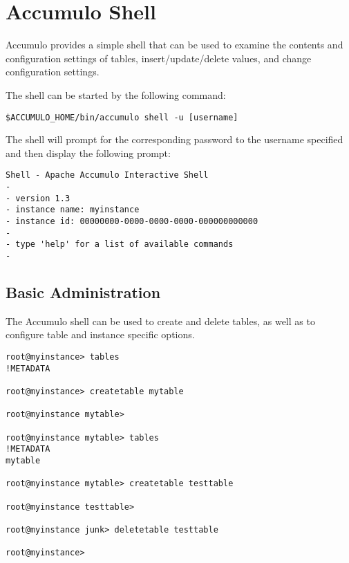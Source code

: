 
%
%

\chapter{Accumulo Shell} 
Accumulo provides a simple shell that can be used to examine the contents and
configuration settings of tables, insert/update/delete values, and change
configuration settings.  

The shell can be started by the following command:

\small
\begin{verbatim}
$ACCUMULO_HOME/bin/accumulo shell -u [username]
\end{verbatim}

\normalsize

The shell will prompt for the corresponding password to the username specified
and then display the following prompt:

\small
\begin{verbatim}
Shell - Apache Accumulo Interactive Shell
-
- version 1.3
- instance name: myinstance
- instance id: 00000000-0000-0000-0000-000000000000
-
- type 'help' for a list of available commands
-
\end{verbatim}
\normalsize

\section{Basic Administration}

The Accumulo shell can be used to create and delete tables, as well as to configure
table and instance specific options.

\small
\begin{verbatim}
root@myinstance> tables
!METADATA

root@myinstance> createtable mytable

root@myinstance mytable>

root@myinstance mytable> tables
!METADATA
mytable

root@myinstance mytable> createtable testtable

root@myinstance testtable>

root@myinstance junk> deletetable testtable

root@myinstance>
\end{verbatim}
\normalsize

